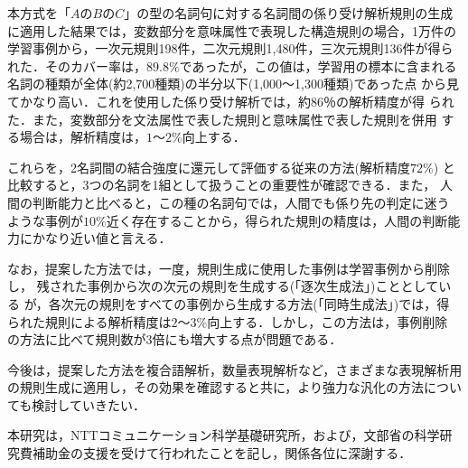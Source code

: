 本方式を「$AのBのC$」の型の名詞句に対する名詞間の係り受け解析規則の生成
に適用した結果では，変数部分を意味属性で表現した構造規則の場合，1万件の
学習事例から，一次元規則198件，二次元規則1,480件，三次元規則136件が得ら
れた．そのカバー率は，$89.8\%$であったが，この値は，学習用の標本に含まれる
名詞の種類が全体(約2,700種類)の半分以下(1,000〜1,300種類)であった点
から見てかなり高い．これを使用した係り受け解析では，約86％の解析精度が得
られた．また，変数部分を文法属性で表した規則と意味属性で表した規則を併用
する場合は，解析精度は，$1〜2\%$向上する．

これらを，2名詞間の結合強度に還元して評価する従来の方法(解析精度$72\%$)
と比較すると，3つの名詞を1組として扱うことの重要性が確認できる．また，
人間の判断能力と比べると，この種の名詞句では，人間でも係り先の判定に迷う
ような事例が$10\%$近く存在することから，得られた規則の精度は，人間の判断能
力にかなり近い値と言える．

なお，提案した方法では，一度，規則生成に使用した事例は学習事例から削除し，
残された事例から次の次元の規則を生成する(「逐次生成法」)こととしている
が，各次元の規則をすべての事例から生成する方法(「同時生成法」)では，得
られた規則による解析精度は$2〜3\%$向上する．しかし，この方法は，事例削除
の方法に比べて規則数が3倍にも増大する点が問題である．

今後は，提案した方法を複合語解析，数量表現解析など，さまざまな表現解析用
の規則生成に適用し，その効果を確認すると共に，より強力な汎化の方法につい
ても検討していきたい．


\acknowledgment

本研究は，NTTコミュニケーション科学基礎研究所，および，文部省の科学研究費補助金の支援を受けて行われたことを記し，関係各位に深謝する．

\nocite{*}



\begin{biography}

\end{biography}



